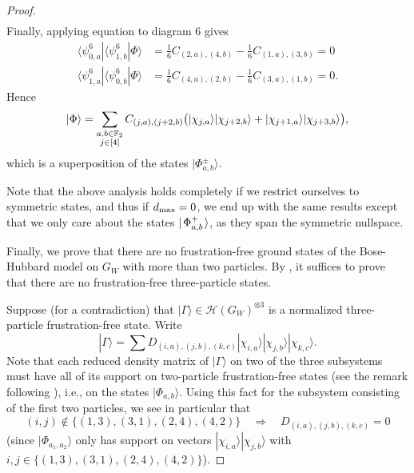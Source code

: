 \documentclass[../thesis-main/thesis-main]{subfiles}
\begin{document}
\begin{proof}
\begin{align}
\end{align}
Finally, applying equation  to diagram $6$ gives
\begin{align}
\langle\psi_{0,a}^{6}|\langle\psi_{1,b}^{6}|\Phi\rangle&=\frac{1}{6}C_{(2,a),(4,b)}-\frac{1}{6}C_{(1,a),(3,b)}=0\\
\langle\psi_{1,a}^{6}|\langle\psi_{0,b}^{6}|\Phi\rangle&=\frac{1}{6}C_{(4,a),(2,b)}-\frac{1}{6}C_{(3,a),(1,b)}=0.
\end{align}
Hence
\begin{equation}
|\Phi\rangle=\sum_{\substack{a,b\in\mathbb{F}_2\\j\in[4]}}C_{(j,a),(j+2,b)}\big(|\chi_{j,a}\rangle|\chi_{j+2,b}\rangle+|\chi_{j+1,a}\rangle|\chi_{j+3,b}\rangle\big),
\end{equation}
which is a superposition of the states $|\Phi_{a,b}^\pm\rangle.$ 

Note that the above analysis holds completely if we restrict ourselves to symmetric states, and thus if $d_{\text{max}} = 0$, we end up with the same results except that we only care about the states $|\mspace{2mu} \Phi_{a,b}^+ \mspace{2mu} \rangle$, as they span the symmetric nullspace.

Finally, we prove that there are no frustration-free ground states of the Bose-Hubbard model on $G_{W}$ with more than two particles. By ,
it suffices to prove that there are no frustration-free three-particle states.

Suppose (for a contradiction) that $|\Gamma\rangle\in\mathcal{H}(G_{W})^{\otimes 3}$ is a normalized three-particle frustration-free state. Write 
\begin{equation}
|\Gamma\rangle=\sum D_{(i,a),(j,b),(k,c)}|\chi_{i,a}\rangle|\chi_{j,b}\rangle|\chi_{k,c}\rangle.
\end{equation}
Note that each reduced density matrix of $|\Gamma\rangle$ on two of the three subsystems must have all of its support on two-particle frustration-free states (see the remark following ), i.e., on the states $|\Phi_{a,b}\rangle$. Using this fact for the subsystem consisting of the first two particles, we see in particular that
\begin{equation}
(i,j)\notin\{(1,3),(3,1),(2,4),(4,2)\}\quad\Longrightarrow\quad D_{(i,a),(j,b),(k,c)}=0\label{eq:ij_constraint1}
\end{equation}
(since $|\Phi_{a_1,a_2}\rangle$ only has support on vectors $|\chi_{i,a}\rangle|\chi_{j,b}\rangle$ with $i,j\in \{(1,3),(3,1),(2,4),(4,2)\}$).


\end{proof}
\end{document}
